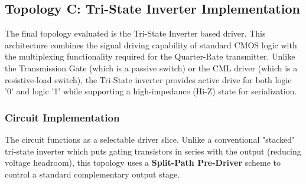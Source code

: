 \documentclass[12pt, a4paper]{report}
\begin{document}
\subsection{Topology C: Tri-State Inverter Implementation}
\label{subsec:tinv_impl}

The final topology evaluated is the Tri-State Inverter based driver. This architecture combines the signal driving capability of standard CMOS logic with the multiplexing functionality required for the Quarter-Rate transmitter. Unlike the Transmission Gate (which is a passive switch) or the CML driver (which is a resistive-load switch), the Tri-State inverter provides active drive for both logic '0' and logic '1' while supporting a high-impedance (Hi-Z) state for serialization.

\subsubsection{Circuit Implementation}
The circuit functions as a selectable driver slice. Unlike a conventional "stacked" tri-state inverter which puts gating transistors in series with the output (reducing voltage headroom), this topology uses a \textbf{Split-Path Pre-Driver} scheme to control a standard complementary output stage.
\end{document}
